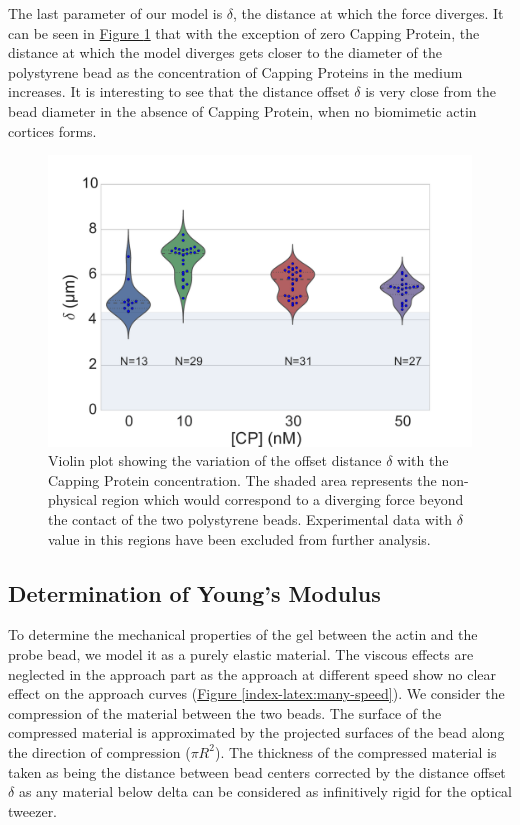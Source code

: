 \documentclass[A4paperpaper,11pt,english]{sphinxmanual}
\begin{document}
The last parameter of our model is \(\delta\), the distance at which the force
diverges.   It can be seen in \hyperref[index-latex:delta-violin]{Figure  \ref*{index-latex:delta-violin}} that with the exception
of zero Capping Protein, the distance at which the model diverges gets
closer to the diameter of the polystyrene bead as the concentration of Capping
Proteins in the medium increases. It is interesting to see that the distance offset
\(\delta\) is very close from the bead diameter in the absence of Capping Protein, when no
biomimetic actin cortices forms.
\begin{figure}[htbp]
\centering
\capstart

\includegraphics[width=0.800\linewidth]{delta_violin.pdf}
\caption{Violin plot showing the variation of the offset distance \(\delta\)
with the Capping Protein concentration. The shaded area represents the
non-physical region which would correspond to a diverging force beyond the
contact of the two polystyrene beads. Experimental data with \(\delta\)
value in this regions have been excluded from further analysis.}\label{index-latex:delta-violin}\end{figure}


\subsection{Determination of Young's Modulus}
\label{index-latex:determination-of-young-s-modulus}
To determine the mechanical properties of the gel between the actin and the
probe bead, we model it as a purely elastic material. The viscous effects are
neglected in the approach part as the approach at different speed show no
clear effect on the approach curves (\hyperref[index-latex:many-speed]{Figure  \ref*{index-latex:many-speed}}). We consider
the compression of the material between the two beads. The surface of the
compressed material is approximated by the projected surfaces of the bead along the
direction of compression (\(\pi R^2\)).  The thickness of the compressed
material is taken as being the distance between bead centers corrected by the
distance offset \(\delta\) as any material below delta can be considered as
infinitively rigid for the optical tweezer.
\end{document}
